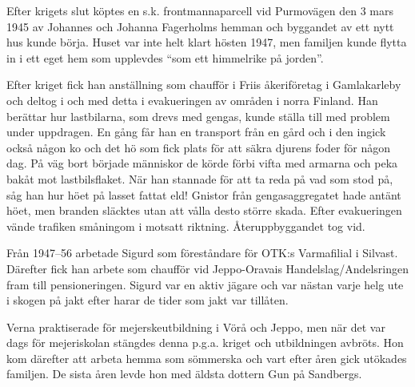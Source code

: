 Efter krigets slut köptes en s.k. frontmannaparcell vid Purmovägen den 3 mars 1945 av Johannes och Johanna Fagerholms hemman och byggandet av ett nytt hus kunde börja. Huset var inte helt klart hösten 1947, men familjen kunde flytta in i ett eget hem som upplevdes ``som ett himmelrike på jorden''.

Efter kriget fick han anställning som chaufför i Friis åkeriföretag i Gamlakarleby och deltog i och med detta i evakueringen av områden i norra Finland. Han berättar hur lastbilarna, som drevs med gengas, kunde ställa till med problem under uppdragen. En gång får han en transport från en gård och i den ingick också någon ko och det hö som fick plats för att säkra djurens foder för någon dag. På väg bort började människor de körde förbi vifta med armarna och peka bakåt mot lastbilsflaket. När han stannade för att ta reda på vad som stod på, såg han hur höet på lasset fattat eld! Gnistor från gengasaggregatet hade antänt höet, men branden släcktes utan att vålla desto större skada. Efter evakueringen vände trafiken småningom i motsatt riktning. Återuppbyggandet tog vid.

Från 1947--56 arbetade Sigurd som föreståndare för OTK:s Varmafilial i Silvast. Därefter fick han arbete som chaufför vid Jeppo-Oravais Handelslag/Andelsringen fram till pensioneringen. Sigurd var en aktiv jägare och var nästan varje helg ute i skogen på jakt efter harar de tider som jakt var tillåten.

Verna praktiserade för mejerskeutbildning i Vörå och Jeppo, men när det var dags för mejeriskolan stängdes denna p.g.a. kriget och utbildningen avbröts. Hon kom därefter att arbeta hemma som sömmerska och vart efter åren gick utökades familjen. De sista åren levde hon med äldsta dottern Gun på Sandbergs.
\begin{jhchildren}
  \item {}
  \item {}
  \item {}
  \item {}
  \item {}
\end{jhchildren}


